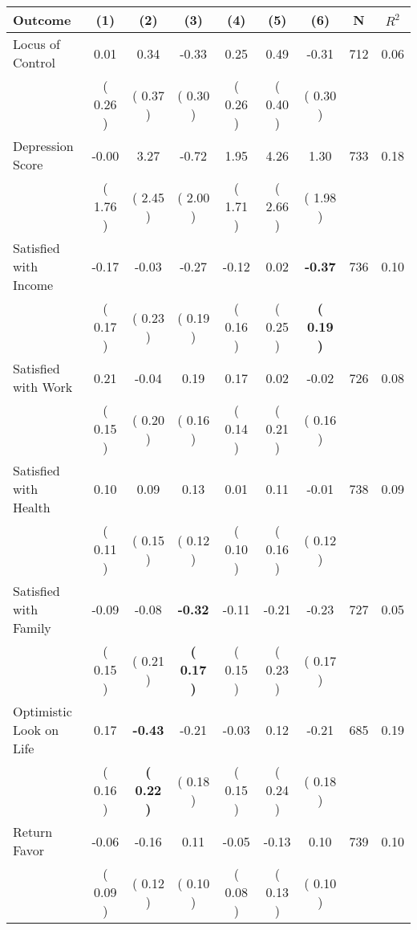 \begin{tabular}{lcccccccc}
\toprule
 \textbf{Outcome} & \textbf{(1)} & \textbf{(2)} & \textbf{(3)} & \textbf{(4)} & \textbf{(5)} & \textbf{(6)} & \textbf{N} & \textbf{$ R^2$} \\
\midrule
Locus of Control &      0.01 &      0.34 &     -0.33 &      0.25 &      0.49 &     -0.31 & 712 &       0.06 \\ 
 & (     0.26 ) & (     0.37 ) & (     0.30 ) & (     0.26 ) & (     0.40 ) & (     0.30 ) & \\
Depression Score &     -0.00 &      3.27 &     -0.72 &      1.95 &      4.26 &      1.30 & 733 &       0.18 \\ 
 & (     1.76 ) & (     2.45 ) & (     2.00 ) & (     1.71 ) & (     2.66 ) & (     1.98 ) & \\
Satisfied with Income &     -0.17 &     -0.03 &     -0.27 &     -0.12 &      0.02 & \textbf{    -0.37} & 736 &       0.10 \\ 
 & (     0.17 ) & (     0.23 ) & (     0.19 ) & (     0.16 ) & (     0.25 ) & \textbf{(     0.19 )} & \\
Satisfied with Work &      0.21 &     -0.04 &      0.19 &      0.17 &      0.02 &     -0.02 & 726 &       0.08 \\ 
 & (     0.15 ) & (     0.20 ) & (     0.16 ) & (     0.14 ) & (     0.21 ) & (     0.16 ) & \\
Satisfied with Health &      0.10 &      0.09 &      0.13 &      0.01 &      0.11 &     -0.01 & 738 &       0.09 \\ 
 & (     0.11 ) & (     0.15 ) & (     0.12 ) & (     0.10 ) & (     0.16 ) & (     0.12 ) & \\
Satisfied with Family &     -0.09 &     -0.08 & \textbf{    -0.32} &     -0.11 &     -0.21 &     -0.23 & 727 &       0.05 \\ 
 & (     0.15 ) & (     0.21 ) & \textbf{(     0.17 )} & (     0.15 ) & (     0.23 ) & (     0.17 ) & \\
Optimistic Look on Life &      0.17 & \textbf{    -0.43} &     -0.21 &     -0.03 &      0.12 &     -0.21 & 685 &       0.19 \\ 
 & (     0.16 ) & \textbf{(     0.22 )} & (     0.18 ) & (     0.15 ) & (     0.24 ) & (     0.18 ) & \\
Return Favor &     -0.06 &     -0.16 &      0.11 &     -0.05 &     -0.13 &      0.10 & 739 &       0.10 \\ 
 & (     0.09 ) & (     0.12 ) & (     0.10 ) & (     0.08 ) & (     0.13 ) & (     0.10 ) & \\

\end{tabular}
